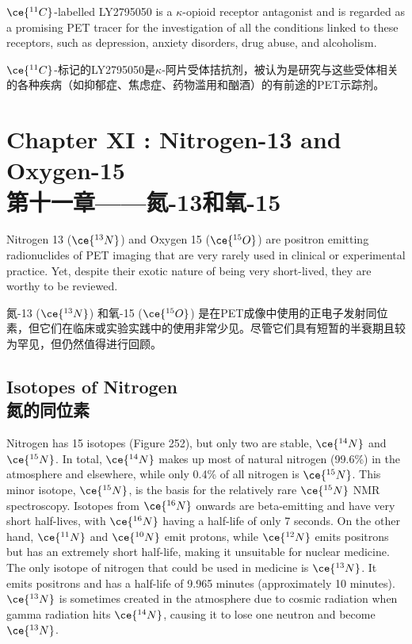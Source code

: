 \documentclass[dvipsnames, svgnames,a4paper,11pt]{article}
\begin{document}
\(\ce{^{11}C}\)-labelled LY2795050 is a \(\kappa\)-opioid receptor antagonist and is regarded as a promising PET tracer for the investigation of all the conditions linked to these receptors, such as depression, anxiety disorders, drug abuse, and alcoholism.

\(\ce{^{11}C}\)-标记的LY2795050是\(\kappa\)-阿片受体拮抗剂，被认为是研究与这些受体相关的各种疾病（如抑郁症、焦虑症、药物滥用和酗酒）的有前途的PET示踪剂。

\newpage

\section{Chapter XI :   Nitrogen-13 and Oxygen-15 \\第十一章——氮-13和氧-15}

Nitrogen 13 (\(\ce{^{13}N}\)) and Oxygen 15 (\(\ce{^{15}O}\)) are positron emitting radionuclides of PET imaging that are very rarely used in clinical or experimental practice. Yet, despite their exotic nature of being very short-lived, they are worthy to be reviewed.

氮-13 (\(\ce{^{13}N}\)) 和氧-15 (\(\ce{^{15}O}\)) 是在PET成像中使用的正电子发射同位素，但它们在临床或实验实践中的使用非常少见。尽管它们具有短暂的半衰期且较为罕见，但仍然值得进行回顾。

\subsection{Isotopes of Nitrogen \\氮的同位素}  
Nitrogen has 15 isotopes (Figure 252), but only two are stable, \(\ce{^{14}N}\) and \(\ce{^{15}N}\). In total, \(\ce{^{14}N}\) makes up most of natural nitrogen (99.6\%) in the atmosphere and elsewhere, while only 0.4\% of all nitrogen is \(\ce{^{15}N}\). This minor isotope, \(\ce{^{15}N}\), is the basis for the relatively rare \(\ce{^{15}N}\) NMR spectroscopy. Isotopes from \(\ce{^{16}N}\) onwards are beta-emitting and have very short half-lives, with \(\ce{^{16}N}\) having a half-life of only 7 seconds. On the other hand, \(\ce{^{11}N}\) and \(\ce{^{10}N}\) emit protons, while \(\ce{^{12}N}\) emits positrons but has an extremely short half-life, making it unsuitable for nuclear medicine. The only isotope of nitrogen that could be used in medicine is \(\ce{^{13}N}\). It emits positrons and has a half-life of 9.965 minutes (approximately 10 minutes). \(\ce{^{13}N}\) is sometimes created in the atmosphere due to cosmic radiation when gamma radiation hits \(\ce{^{14}N}\), causing it to lose one neutron and become \(\ce{^{13}N}\).
\end{document}
